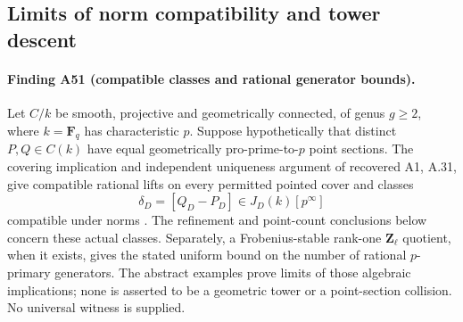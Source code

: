 \subsection{Limits of norm compatibility and tower descent}
\label{sec:norm-compatibility-towers}

\paragraph{Finding A51 (compatible classes and rational generator bounds).}
Let $C/k$ be smooth, projective and geometrically connected,
of genus $g\ge2$, where $k=\mathbf F_q$ has characteristic $p$.
Suppose hypothetically that distinct $P,Q\in C(k)$ have equal
geometrically pro-prime-to-$p$ point sections. The covering
implication and independent uniqueness argument of recovered
A1, A.31, give compatible rational lifts on every permitted
pointed cover and classes
\[
       \delta_D=[Q_D-P_D]\in J_D(k)[p^\infty]
       \tag{NC.1}
\]
compatible under norms \cite[claim A.31]{A1run}.
The refinement and point-count conclusions below concern these
actual classes. Separately, a Frobenius-stable rank-one
$\mathbf Z_\ell$ quotient, when it exists, gives the stated
uniform bound on the number of rational $p$-primary generators.
The abstract examples prove limits of those algebraic
implications; none is asserted to be a geometric tower or
a point-section collision. No universal witness is supplied.

